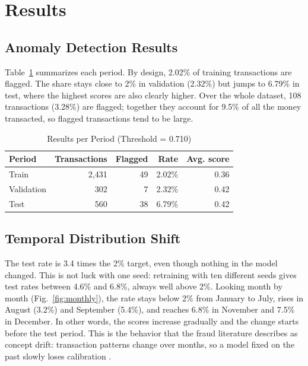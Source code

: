 \documentclass[journal]{IEEEtran}
\begin{document}

\section{Results}

\subsection{Anomaly Detection Results}

Table~\ref{tab:split_metrics} summarizes each period. By design, 2.02\% of training transactions are flagged. The share stays close to 2\% in validation (2.32\%) but jumps to 6.79\% in test, where the highest scores are also clearly higher. Over the whole dataset, 108 transactions (3.28\%) are flagged; together they account for 9.5\% of all the money transacted, so flagged transactions tend to be large.

\begin{table}[!t]
\renewcommand{\arraystretch}{1.2}
\caption{Results per Period (Threshold = 0.710)}
\label{tab:split_metrics}
\centering
\begin{tabular}{lrrrr}
\hline
\textbf{Period} & \textbf{Transactions} & \textbf{Flagged} & \textbf{Rate} & \textbf{Avg. score} \\
\hline
Train      & 2,431 & 49 & 2.02\% & 0.36 \\
Validation &   302 &  7 & 2.32\% & 0.42 \\
Test       &   560 & 38 & 6.79\% & 0.42 \\
\hline
\end{tabular}
\end{table}

\subsection{Temporal Distribution Shift}

The test rate is 3.4 times the 2\% target, even though nothing in the model changed. This is not luck with one seed: retraining with ten different seeds gives test rates between 4.6\% and 6.8\%, always well above 2\%. Looking month by month (Fig.~\ref{fig:monthly}), the rate stays below 2\% from January to July, rises in August (3.2\%) and September (5.4\%), and reaches 6.8\% in November and 7.5\% in December. In other words, the scores increase gradually and the change starts before the test period. This is the behavior that the fraud literature describes as concept drift: transaction patterns change over months, so a model fixed on the past slowly loses calibration \cite{dalpozzolo2018realistic,gama2014survey}.
\end{document}
